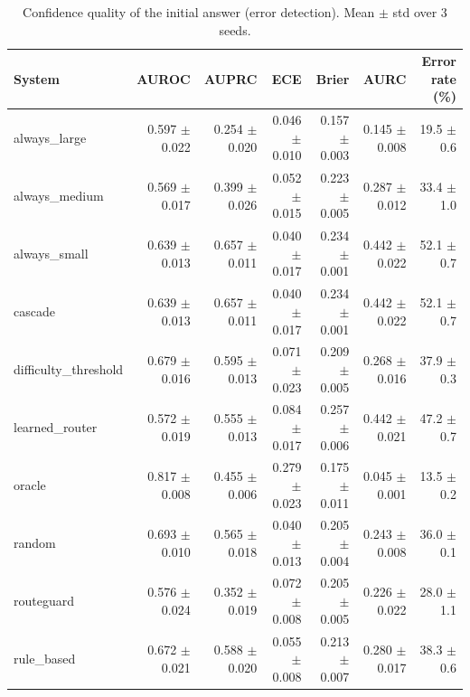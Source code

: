 \begin{table}[t]
\centering
\small
\caption{Confidence quality of the initial answer (error detection). Mean $\pm$ std over 3 seeds.}
\label{tab:calibration}
\begin{tabular}{lrrrrrr}
\toprule
System & AUROC & AUPRC & ECE & Brier & AURC & Error rate (\%) \\
\midrule
always\_large & 0.597 $\pm$ 0.022 & 0.254 $\pm$ 0.020 & 0.046 $\pm$ 0.010 & 0.157 $\pm$ 0.003 & 0.145 $\pm$ 0.008 & 19.5 $\pm$ 0.6 \\
always\_medium & 0.569 $\pm$ 0.017 & 0.399 $\pm$ 0.026 & 0.052 $\pm$ 0.015 & 0.223 $\pm$ 0.005 & 0.287 $\pm$ 0.012 & 33.4 $\pm$ 1.0 \\
always\_small & 0.639 $\pm$ 0.013 & 0.657 $\pm$ 0.011 & 0.040 $\pm$ 0.017 & 0.234 $\pm$ 0.001 & 0.442 $\pm$ 0.022 & 52.1 $\pm$ 0.7 \\
cascade & 0.639 $\pm$ 0.013 & 0.657 $\pm$ 0.011 & 0.040 $\pm$ 0.017 & 0.234 $\pm$ 0.001 & 0.442 $\pm$ 0.022 & 52.1 $\pm$ 0.7 \\
difficulty\_threshold & 0.679 $\pm$ 0.016 & 0.595 $\pm$ 0.013 & 0.071 $\pm$ 0.023 & 0.209 $\pm$ 0.005 & 0.268 $\pm$ 0.016 & 37.9 $\pm$ 0.3 \\
learned\_router & 0.572 $\pm$ 0.019 & 0.555 $\pm$ 0.013 & 0.084 $\pm$ 0.017 & 0.257 $\pm$ 0.006 & 0.442 $\pm$ 0.021 & 47.2 $\pm$ 0.7 \\
oracle & 0.817 $\pm$ 0.008 & 0.455 $\pm$ 0.006 & 0.279 $\pm$ 0.023 & 0.175 $\pm$ 0.011 & 0.045 $\pm$ 0.001 & 13.5 $\pm$ 0.2 \\
random & 0.693 $\pm$ 0.010 & 0.565 $\pm$ 0.018 & 0.040 $\pm$ 0.013 & 0.205 $\pm$ 0.004 & 0.243 $\pm$ 0.008 & 36.0 $\pm$ 0.1 \\
routeguard & 0.576 $\pm$ 0.024 & 0.352 $\pm$ 0.019 & 0.072 $\pm$ 0.008 & 0.205 $\pm$ 0.005 & 0.226 $\pm$ 0.022 & 28.0 $\pm$ 1.1 \\
rule\_based & 0.672 $\pm$ 0.021 & 0.588 $\pm$ 0.020 & 0.055 $\pm$ 0.008 & 0.213 $\pm$ 0.007 & 0.280 $\pm$ 0.017 & 38.3 $\pm$ 0.6 \\
\bottomrule
\end{tabular}
\end{table}
